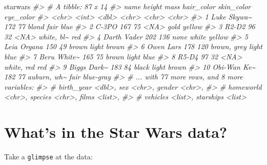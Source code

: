 \documentclass[
]{book}
\newenvironment{Shaded}{\begin{snugshade}}{\end{snugshade}}
\newcommand{\CommentTok}[1]{\textcolor[rgb]{0.56,0.35,0.01}{\textit{#1}}}
\newcommand{\NormalTok}[1]{#1}
\theoremstyle{definition}
\theoremstyle{definition}
\theoremstyle{definition}
\theoremstyle{definition}
\theoremstyle{remark}
\begin{document}
\begin{Shaded}
\begin{Highlighting}[]
\NormalTok{starwars}
\CommentTok{\#\textgreater{} \# A tibble: 87 x 14}
\CommentTok{\#\textgreater{}    name        height  mass hair\_color  skin\_color eye\_color}
\CommentTok{\#\textgreater{}    \textless{}chr\textgreater{}        \textless{}int\textgreater{} \textless{}dbl\textgreater{} \textless{}chr\textgreater{}       \textless{}chr\textgreater{}      \textless{}chr\textgreater{}    }
\CommentTok{\#\textgreater{}  1 Luke Skywa\textasciitilde{}    172    77 blond       fair       blue     }
\CommentTok{\#\textgreater{}  2 C{-}3PO          167    75 \textless{}NA\textgreater{}        gold       yellow   }
\CommentTok{\#\textgreater{}  3 R2{-}D2           96    32 \textless{}NA\textgreater{}        white, bl\textasciitilde{} red      }
\CommentTok{\#\textgreater{}  4 Darth Vader    202   136 none        white      yellow   }
\CommentTok{\#\textgreater{}  5 Leia Organa    150    49 brown       light      brown    }
\CommentTok{\#\textgreater{}  6 Owen Lars      178   120 brown, grey light      blue     }
\CommentTok{\#\textgreater{}  7 Beru White\textasciitilde{}    165    75 brown       light      blue     }
\CommentTok{\#\textgreater{}  8 R5{-}D4           97    32 \textless{}NA\textgreater{}        white, red red      }
\CommentTok{\#\textgreater{}  9 Biggs Dark\textasciitilde{}    183    84 black       light      brown    }
\CommentTok{\#\textgreater{} 10 Obi{-}Wan Ke\textasciitilde{}    182    77 auburn, wh\textasciitilde{} fair       blue{-}gray}
\CommentTok{\#\textgreater{} \# ... with 77 more rows, and 8 more variables:}
\CommentTok{\#\textgreater{} \#   birth\_year \textless{}dbl\textgreater{}, sex \textless{}chr\textgreater{}, gender \textless{}chr\textgreater{},}
\CommentTok{\#\textgreater{} \#   homeworld \textless{}chr\textgreater{}, species \textless{}chr\textgreater{}, films \textless{}list\textgreater{},}
\CommentTok{\#\textgreater{} \#   vehicles \textless{}list\textgreater{}, starships \textless{}list\textgreater{}}
\end{Highlighting}
\end{Shaded}

\hypertarget{whats-in-the-star-wars-data}{%
\section{What's in the Star Wars data?}\label{whats-in-the-star-wars-data}}

Take a \texttt{glimpse} at the data:
\end{document}
